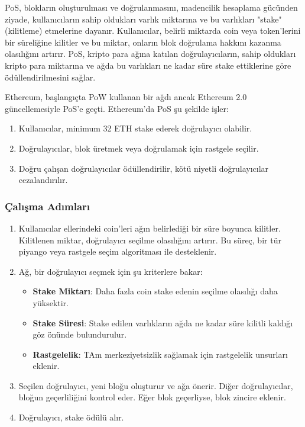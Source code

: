 PoS, blokların oluşturulması ve doğrulanmasını, madencilik hesaplama gücünden ziyade, kullanıcıların sahip oldukları varlık miktarına ve bu varlıkları "stake" (kilitleme) etmelerine dayanır. Kullanıcılar, belirli miktarda coin veya token'lerini bir süreliğine kilitler ve bu miktar, onların blok doğrulama hakkını kazanma olasılığını artırır. PoS, kripto para ağına katılan doğrulayıcıların, sahip oldukları kripto para miktarına ve ağda bu varlıkları ne kadar süre stake ettiklerine göre ödüllendirilmesini sağlar.

Ethereum, başlangıçta PoW kullanan bir ağdı ancak Ethereum 2.0 güncellemesiyle PoS'e geçti. Ethereum'da PoS şu şekilde işler:

\begin{enumerate}
    \item Kullanıcılar, minimum 32 ETH stake ederek doğrulayıcı olabilir.
    \item Doğrulayıcılar, blok üretmek veya doğrulamak için rastgele seçilir.
    \item Doğru çalışan doğrulayıcılar ödüllendirilir, kötü niyetli doğrulayıcılar cezalandırılır.
\end{enumerate}

\subsubsection{Çalışma Adımları}

\begin{enumerate}
    \item Kullanıcılar ellerindeki coin'leri ağın belirlediği bir süre boyunca kilitler. Kilitlenen miktar, doğrulayıcı seçilme olasılığını artırır. Bu süreç, bir tür piyango veya rastgele seçim algoritması ile desteklenir.
    \item Ağ, bir doğrulayıcı seçmek için şu kriterlere bakar:
    \begin{itemize}
        \item \textbf{Stake Miktarı}: Daha fazla coin stake edenin seçilme olasılığı daha yüksektir.
        \item \textbf{Stake Süresi}: Stake edilen varlıkların ağda ne kadar süre kilitli kaldığı göz önünde bulundurulur.
        \item \textbf{Rastgelelik}: TAm merkeziyetsizlik sağlamak için rastgelelik unsurları eklenir.
    \end{itemize}
    \item Seçilen doğrulayıcı, yeni bloğu oluşturur ve ağa önerir. Diğer doğrulayıcılar, bloğun geçerliliğini kontrol eder. Eğer blok geçerliyse, blok zincire eklenir.
    \item Doğrulayıcı, stake ödülü alır.
\end{enumerate}

